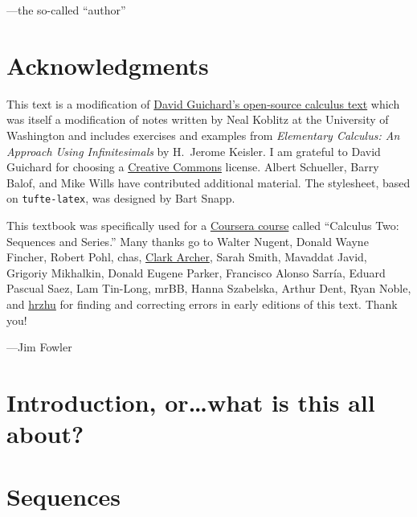 \documentclass[justified]{tufte-book}
\begin{document}
\vspace{0.5in}
\hfill---the so-called ``author''

\chapter*{Acknowledgments}

This text is a modification of
\href{http://www.whitman.edu/mathematics/calculus/}{David Guichard's
  open-source calculus text} which was itself a modification of notes
written by Neal Koblitz at the University of Washington and includes
exercises and examples from {\it Elementary Calculus: An Approach
  Using Infinitesimals} by H.~Jerome Keisler.  I am grateful to David
Guichard for choosing a
\href{http://creativecommons.org/licenses/by-nc-sa/3.0/}{Creative
  Commons} license.  Albert Schueller, Barry Balof, and Mike Wills
have contributed additional material.  The stylesheet, based on \texttt{tufte-latex}, was designed by Bart Snapp.

This textbook was specifically used for a
\href{https://www.coursera.org/course/sequence}{Coursera course}
called ``Calculus Two: Sequences and Series.''  Many thanks go to
Walter Nugent, Donald Wayne Fincher, Robert Pohl, chas,
\href{https://github.com/clark-archer}{Clark Archer}, Sarah Smith,
Mavaddat Javid, Grigoriy Mikhalkin, Donald Eugene Parker, Francisco Alonso Sarr\'ia, Eduard Pascual Saez, Lam Tin-Long, mrBB, Hanna
Szabelska, Arthur Dent, Ryan Noble, and
\href{https://github.com/hrzhu}{hrzhu} for finding and correcting
errors in early editions of this text.  Thank you!

\vspace{0.5in}
\hfill---Jim Fowler

\mainmatter

\chapter*{Introduction, or\ldots what is this all about?}



\chapter{Sequences}
\label{chapter:sequences}

\end{document}

